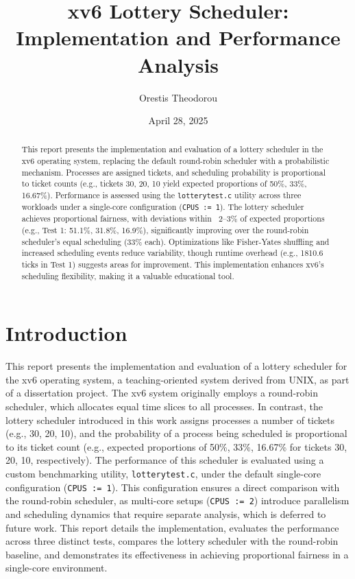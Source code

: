 \documentclass{article}
\title{xv6 Lottery Scheduler: Implementation and Performance Analysis}
\author{Orestis Theodorou}
\date{April 28, 2025}
\begin{document}
\maketitle

\begin{abstract}
This report presents the implementation and evaluation of a lottery scheduler in the xv6 operating system, replacing the default round-robin scheduler with a probabilistic mechanism. Processes are assigned tickets, and scheduling probability is proportional to ticket counts (e.g., tickets 30, 20, 10 yield expected proportions of 50\%, 33\%, 16.67\%). Performance is assessed using the \texttt{lotterytest.c} utility across three workloads under a single-core configuration (\texttt{CPUS := 1}). The lottery scheduler achieves proportional fairness, with deviations within ~2–3\% of expected proportions (e.g., Test 1: 51.1\%, 31.8\%, 16.9\%), significantly improving over the round-robin scheduler’s equal scheduling (33\% each). Optimizations like Fisher-Yates shuffling and increased scheduling events reduce variability, though runtime overhead (e.g., 1810.6 ticks in Test 1) suggests areas for improvement. This implementation enhances xv6’s scheduling flexibility, making it a valuable educational tool.
\end{abstract}

\section{Introduction}
This report presents the implementation and evaluation of a lottery scheduler for the xv6 operating system, a teaching-oriented system derived from UNIX, as part of a dissertation project. The xv6 system originally employs a round-robin scheduler, which allocates equal time slices to all processes. In contrast, the lottery scheduler introduced in this work assigns processes a number of tickets (e.g., 30, 20, 10), and the probability of a process being scheduled is proportional to its ticket count (e.g., expected proportions of 50\%, 33\%, 16.67\% for tickets 30, 20, 10, respectively). The performance of this scheduler is evaluated using a custom benchmarking utility, \texttt{lotterytest.c}, under the default single-core configuration (\texttt{CPUS := 1}). This configuration ensures a direct comparison with the round-robin scheduler, as multi-core setups (\texttt{CPUS := 2}) introduce parallelism and scheduling dynamics that require separate analysis, which is deferred to future work. This report details the implementation, evaluates the performance across three distinct tests, compares the lottery scheduler with the round-robin baseline, and demonstrates its effectiveness in achieving proportional fairness in a single-core environment.
\end{document}
